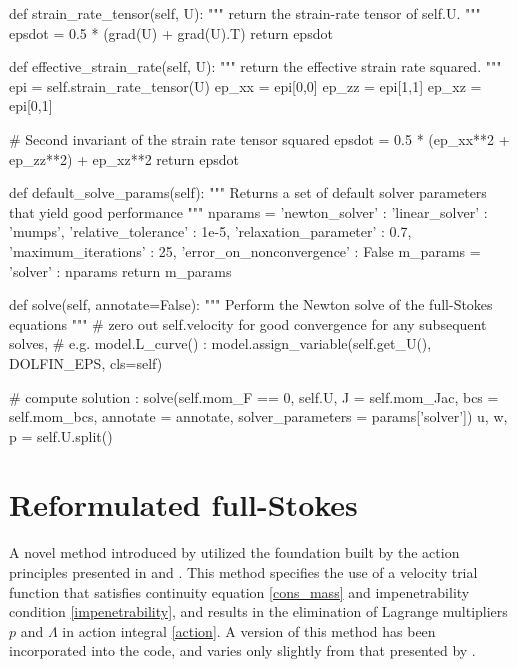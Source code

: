 \begin{python}[label=cslvr_plane_strain, caption={\CSLVR source code contained in the \texttt{MomentumDukowiczPlaneStrain} class.}]
def strain_rate_tensor(self, U):
  """
  return the strain-rate tensor of self.U.
  """
  epsdot = 0.5 * (grad(U) + grad(U).T)
  return epsdot

def effective_strain_rate(self, U):
  """
  return the effective strain rate squared.
  """
  epi    = self.strain_rate_tensor(U)
  ep_xx  = epi[0,0]
  ep_zz  = epi[1,1]
  ep_xz  = epi[0,1]
  
  # Second invariant of the strain rate tensor squared
  epsdot = 0.5 * (ep_xx**2 + ep_zz**2) + ep_xz**2
  return epsdot

def default_solve_params(self):
  """ 
  Returns a set of default solver parameters that yield good performance
  """
  nparams = {'newton_solver' : {'linear_solver'            : 'mumps',
                                'relative_tolerance'       : 1e-5,
                                'relaxation_parameter'     : 0.7,
                                'maximum_iterations'       : 25,
                                'error_on_nonconvergence'  : False}}
  m_params  = {'solver'      : nparams}
  return m_params

def solve(self, annotate=False):
  """ 
  Perform the Newton solve of the full-Stokes equations 
  """
  # zero out self.velocity for good convergence for any subsequent solves,
  # e.g. model.L_curve() :
  model.assign_variable(self.get_U(), DOLFIN_EPS, cls=self)
  
  # compute solution :
  solve(self.mom_F == 0, self.U, J = self.mom_Jac, bcs = self.mom_bcs,
        annotate = annotate, solver_parameters = params['solver'])
  u, w, p = self.U.split()
\end{python}




\section{Reformulated full-Stokes} \label{ssn_reformulated_stokes}

A novel method introduced by \citet{dukowicz_2012} utilized the foundation built by the action principles presented in \citet{dukowicz_2010} and \citet{dukowicz_2011}.  This method specifies the use of a velocity trial function that satisfies continuity equation \cref{cons_mass} and impenetrability condition \cref{impenetrability}, and results in the elimination of Lagrange multipliers $p$ and $\Lambda$ in action integral \cref{action}.  A version of this method has been incorporated into the \CSLVR code, and varies only slightly from that presented by \citet{dukowicz_2012}.

